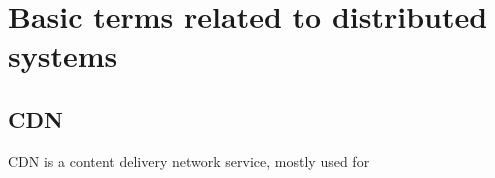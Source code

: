 \chapter{Basic terms related to distributed systems}

\section{CDN}
CDN is a content delivery network service, mostly used for 